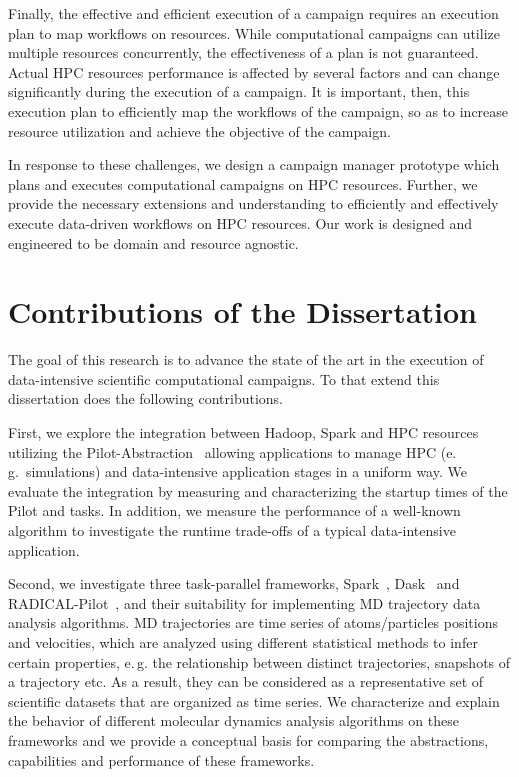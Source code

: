 Finally, the effective and efficient execution of a campaign requires an execution plan to map workflows on resources.
While computational campaigns can utilize multiple resources concurrently, the effectiveness of a plan is not guaranteed.
Actual HPC resources performance is affected by several factors and can change significantly during the execution of a campaign.
It is important, then, this execution plan to efficiently map the workflows of the campaign, so as to increase resource utilization and achieve the objective of the campaign.

In response to these challenges, we design a campaign manager prototype which plans and executes computational campaigns on HPC resources.
Further, we provide the necessary extensions and understanding to efficiently and effectively execute data-driven workflows on HPC resources.
Our work is designed and engineered to be domain and resource agnostic.


\section{Contributions of the Dissertation}
The goal of this research is to advance the state of the art in the execution of data-intensive scientific computational campaigns.
To that extend this dissertation does the following contributions.

First, we explore the integration between Hadoop, Spark and HPC resources utilizing the Pilot-Abstraction~\cite{luckow2012pstar} allowing applications to manage HPC (e.\,g.\ simulations) and data-intensive application stages in a uniform way.
We evaluate the integration by measuring and characterizing the startup times of the Pilot and tasks.
In addition, we measure the performance of a well-known  algorithm to investigate the runtime trade-offs of a typical data-intensive application.

Second, we investigate three task-parallel frameworks, Spark~\cite{zaharia2010spark}, Dask~\cite{rocklin2015dask} and RADICAL-Pilot~\cite{merzky2019using}, and their suitability for implementing MD trajectory data analysis algorithms.
MD trajectories are time series of atoms/particles positions and velocities, which are analyzed using different statistical methods to infer certain properties, e.\,g. the relationship between distinct trajectories, snapshots of a trajectory etc.
As a result, they can be considered as a representative set of scientific datasets that are organized as time series. 
We characterize and explain the behavior of different molecular dynamics analysis algorithms on these frameworks and we provide a conceptual basis for comparing the abstractions, capabilities and performance of these frameworks.

